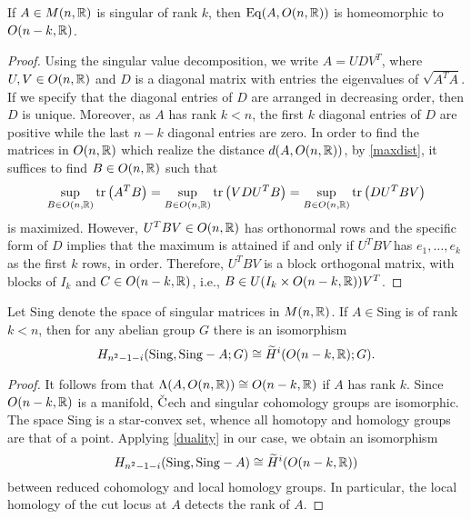 \begin{lemma}\cite[Lemma 2.15]{BaPr21}\label{link-sing}
    If $A\in M(n,\mathbb{R})$ is singular of rank $k$, then $\mathrm{Eq}(A,O(n,\mathbb{R}))$ is homeomorphic to $O(n-k,\mathbb{R})$.
\end{lemma}
\begin{proof}
    Using the singular value decomposition,  we write $A=UDV^T$, where $U,V\in O(n,\mathbb{R})$ and $D$ is a diagonal matrix with entries the eigenvalues of $\sqrt{A^T A}$. If we specify that the diagonal entries of $D$ are arranged in decreasing order, then $D$ is unique. Moreover, as $A$ has rank $k<n$, the first $k$ diagonal entries of $D$ are positive while the last $n-k$ diagonal entries are zero. In order to find the matrices in $O(n,\mathbb{R})$ which realize the distance $d(A,O(n,\mathbb{R}))$, by \eqref{maxdist}, it suffices to find $B\in O(n,\mathbb{R})$ such that 
    \begin{displaymath}
        \sup_{B\in O(n,\mathbb{R})} \mathrm{tr}\left( A^T B \right)=\sup_{B\in O(n,\mathbb{R})} \mathrm{tr}\left( VDU^T B \right)=\sup_{B\in O(n,\mathbb{R})} \mathrm{tr}\left( DU^T BV \right)
    \end{displaymath}
    is maximized. However, $U^TBV\in O(n,\mathbb{R})$ has orthonormal rows and the specific form of $D$ implies that the maximum is attained if and only if $U^T BV$ has $e_1,\ldots,e_k$ as the first $k$ rows, in order. Therefore, $U^T BV$ is a block orthogonal matrix, with blocks of $I_k$ and $C\in O(n-k,\mathbb{R})$, i.e., $B\in U(I_k \times O(n-k,\mathbb{R}))V^T$.
\end{proof}
\begin{cor}\label{locsinghom}
    Let $\mathrm{Sing}$ denote the space of singular matrices in $M(n,\mathbb{R})$. If $A\in \mathrm{Sing}$ is of rank $k<n$, then for any abelian group $G$ there is an isomorphism
    \begin{equation}\label{locsing}
        H_{n^2-1-i}(\mathrm{Sing},\mathrm{Sing} -A;G) \cong \widetilde{H}^i(O(n-k,\mathbb{R});G).
    \end{equation}
\end{cor}

\begin{proof}
    It follows from  that $\Lambda(A,O(n,\mathbb{R}))\cong O(n-k,\mathbb{R})$ if $A$ has rank $k$. Since $O(n-k,\mathbb{R})$ is a manifold, $\check{\textup{C}}$ech and singular cohomology groups are isomorphic. The space $\mathrm{Sing}$ is a star-convex set, whence all homotopy and homology groups are that of a point. Applying \eqref{duality} in our case, we obtain an isomorphism
    \begin{equation*}
        H_{n^2-1-i}(\mathrm{Sing},\mathrm{Sing} -A)\cong\widetilde{H}^i(O(n-k,\mathbb{R}))
    \end{equation*}
    between reduced cohomology and local homology  groups. In particular, the local homology of the cut locus at $A$ detects the rank of $A$. 
\end{proof}


